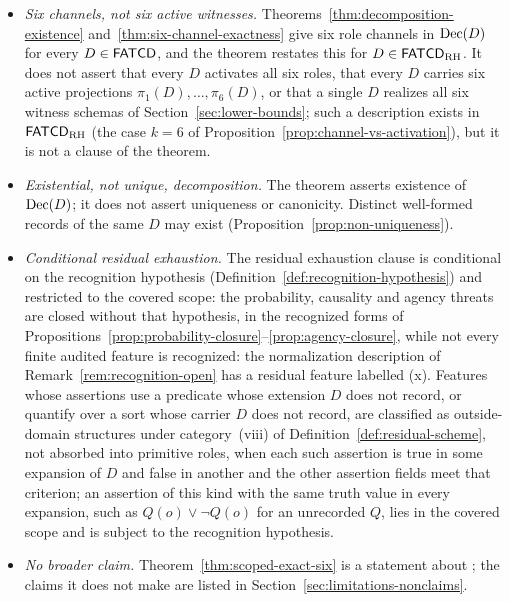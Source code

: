 \begin{itemize}[topsep=2pt,itemsep=1pt]
  \item \emph{Six channels, not six active witnesses.}
    Theorems~\ref{thm:decomposition-existence}
    and~\ref{thm:six-channel-exactness} give six role channels in \(\operatorname{Dec}\!\left(D\right)\)
    for every \(D \in \mathsf{FATCD}{}\), and the theorem restates this for
    \(D\in\mathsf{FATCD}_{\mathrm{RH}}\). It does not assert that every \(D\) activates
    all six roles, that every \(D\) carries six active projections
    \(\pi_1(D), \ldots, \pi_6(D)\), or that a single \(D\) realizes
    all six witness schemas of Section~\ref{sec:lower-bounds}; such a
    description exists in \(\mathsf{FATCD}_{\mathrm{RH}}\) (the case \(k=6\) of
    Proposition~\ref{prop:channel-vs-activation}), but it is not a clause of
    the theorem.
  \item \emph{Existential, not unique, decomposition.} The theorem
    asserts existence of \(\operatorname{Dec}\!\left(D\right)\); it does not assert uniqueness or
    canonicity. Distinct well-formed records of the same \(D\) may
    exist (Proposition~\ref{prop:non-uniqueness}).
  \item \emph{Conditional residual exhaustion.} The residual
    exhaustion clause is conditional on the recognition hypothesis
    (Definition~\ref{def:recognition-hypothesis}) and restricted to the
    covered scope: the probability, causality and agency threats are
    closed without that hypothesis, in the recognized forms of
    Propositions~\ref{prop:probability-closure}--\ref{prop:agency-closure},
    while not every finite audited feature is recognized: the
    normalization description of Remark~\ref{rem:recognition-open} has a
    residual feature labelled (x). Features whose assertions use a predicate whose extension \(D\) does not record, or quantify over a sort whose carrier \(D\) does not record, are classified as outside-domain structures under category~(viii) of Definition~\ref{def:residual-scheme}, not absorbed into primitive roles, when each such assertion is true in some expansion of \(D\) and false in another and the other assertion fields meet that criterion; an assertion of this kind with the same truth value in every expansion, such as \(Q(o)\vee\neg Q(o)\) for an unrecorded \(Q\), lies in the covered scope and is subject to the recognition hypothesis.
  \item \emph{No broader claim.} Theorem~\ref{thm:scoped-exact-six}
    is a statement about \FATCD{}; the claims it does not make are
    listed in Section~\ref{sec:limitations-nonclaims}.
\end{itemize}


